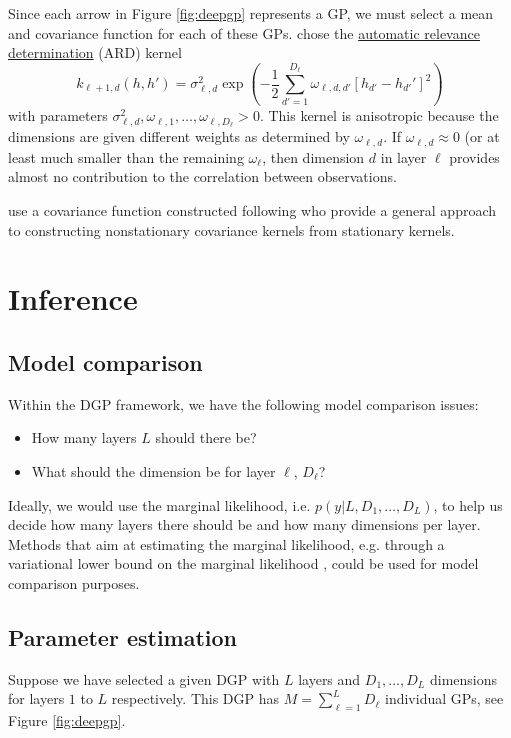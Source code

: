 \documentclass{article}
\newcommand{\1}{\mathbbm{1}}
\begin{document}
Since each arrow in Figure \ref{fig:deepgp} represents a GP,
we must select a mean and covariance function for each of these GPs.
\cite{damianou2013deep} chose the \underline{automatic relevance determination} (ARD)
kernel
\[
k_{\ell+1,d}(h,h') =
\sigma^2_{\ell,d} \exp\left(-\frac{1}{2} \sum_{d'=1}^{D_\ell} \omega_{\ell,d,d'} \left[ h_{d'} - h_{d'}' \right]^2\right)
\]
with parameters $\sigma^2_{\ell,d},\omega_{\ell,1},\ldots,\omega_{\ell,D_\ell} > 0$.
This kernel is anisotropic because the dimensions are given different weights
as determined by $\omega_{\ell,d}$.
If $\omega_{\ell,d} \approx 0$ (or at least much smaller than the remaining $\omega_{\ell}$,
then dimension $d$ in layer $\ell$ provides almost no contribution to the correlation between
observations.

\cite{dunlop2018deep} use a covariance function constructed following
\cite{paciorek2004nonstationary} who provide a general approach to constructing
nonstationary covariance kernels from stationary kernels.




\section{Inference}

\subsection{Model comparison}

Within the DGP framework,
we have the following model comparison issues:

\begin{itemize}
\item How many layers $L$ should there be?
\item What should the dimension be for layer $\ell$, $D_\ell$?
\end{itemize}
Ideally, we would use the marginal likelihood,
i.e. $p(y|L,D_1,\ldots,D_L)$, to help us decide how many layers there should be
and how many dimensions per layer.
Methods that aim at estimating the marginal likelihood,
e.g. through a variational lower bound on the marginal likelihood \citep{damianou2013deep},
could be used for model comparison purposes.

\subsection{Parameter estimation}

Suppose we have selected a given DGP with $L$ layers and $D_1,\ldots,D_L$
dimensions for layers $1$ to $L$ respectively.
This DGP has $M=\sum_{\ell=1}^L D_\ell$ individual GPs,
see Figure \ref{fig:deepgp}.
\end{document}
